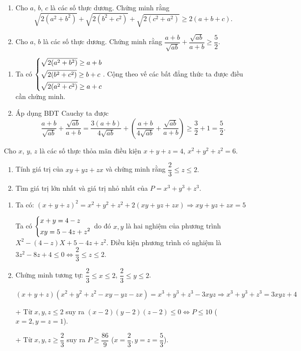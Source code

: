 \begin{ex}%
    \hfill
    \begin{enumerate}
        \item Cho $a$, $b$, $c$ là các số thực dương. Chứng minh rằng $$\sqrt{2\left(a^2+b^2\right)}+\sqrt{2\left(b^2+c^2\right)}+\sqrt{2\left(c^2+a^2\right)}\geq 2\left(a+b+c\right).$$
        \item Cho $a$, $b$ là các số thực dương. Chứng minh rằng $\dfrac{a+b}{\sqrt{ab}}+\dfrac{\sqrt{ab}}{a+b}\geq\dfrac{5}{2}.$
    \end{enumerate}
\loigiai
    {
    \begin{enumerate}
        \item Ta có $\left\{\begin{aligned}&\sqrt{2(a^2+b^2)}\geq a+b\\&\sqrt{2(b^2+c^2)}\geq b+c\\&\sqrt{2(a^2+c^2)}\geq a+c\end{aligned}\right.$. Cộng theo vế các bất đẳng thức ta được điều cần chứng minh.
        \item Áp dụng BĐT Cauchy ta được $$\dfrac{a+b}{\sqrt{ab}}+\dfrac{\sqrt{ab}}{a+b}=\dfrac{3(a+b)}{4\sqrt{ab}}+\left(\dfrac{a+b}{4\sqrt{ab}}+\dfrac{\sqrt{ab}}{a+b}\right)\geq \dfrac{3}{2}+1=\dfrac{5}{2}.$$
    \end{enumerate}
    }
\end{ex}
\begin{ex}%
	Cho $x$, $y$, $z$ là các số thực thỏa mãn điều kiện $x+y+z=4$, $x^2+y^2+z^2=6$.
	\begin{enumerate}
		\item Tính giá trị của $xy+yz+zx$ và chứng minh rằng $\dfrac{2}{3}\leq z\leq 2.$
		\item Tìm giá trị lớn nhất và giá trị nhỏ nhất của $P=x^3+y^3+z^3.$
	\end{enumerate}
	\loigiai
	{
		\begin{enumerate}
			\item Ta có: $(x+y+z)^2=x^2+y^2+z^2+2(xy+yz+zx)\Rightarrow xy+yz+zx=5$
			
			Ta có $\left\{\begin{aligned}&x+y=4-z\\&xy=5-4z+z^2\end{aligned}\right.$ do đó $x,y$ là hai nghiệm của phương trình $X^2-(4-z)X+5-4z+z^2$. Điều kiện phương trình có nghiệm là $3z^2-8z+4\leq 0\Leftrightarrow \dfrac{2}{3}\leq z\leq 2.$
			\item Chứng minh tương tự: $\dfrac{2}{3}\leq x\leq 2$, $\dfrac{2}{3}\leq y\leq 2$.
			
			$(x+y+z)(x^2+y^2+z^2-xy-yz-zx)=x^3+y^3+z^3-3xyz\Rightarrow x^3+y^3+z^3=3xyz+4$
			
			+ Từ $x,y,z\leq 2$ suy ra $(x-2)(y-2)(z-2)\leq 0\Leftrightarrow P\leq 10$ ($x=2,y=z=1$).
			
			+ Từ $x,y,z\geq\dfrac{2}{3}$ suy ra $P\geq\dfrac{86}{9}$ ($x=\dfrac{2}{3},y=z=\dfrac{5}{3}$).
		\end{enumerate}
	}
\end{ex}
